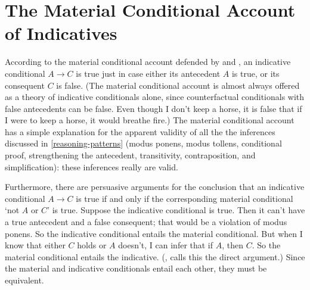 \section{The Material Conditional Account of Indicatives}
\label{material}

According to the material conditional account defended by \citet{grice-studies} and \citet{jackson}, an indicative conditional $A \rightarrow C$ is true just in case either its antecedent $A$ is true, or its consequent $C$ is false.  (The material conditional account is almost always offered as a theory of indicative conditionals alone, since counterfactual conditionals with false antecedents can be false.  Even though I don't keep a horse, it is false that if I were to keep a horse, it would breathe fire.)  The material conditional account has a simple explanation for the apparent validity of all the the inferences discussed in \autoref{reasoning-patterns} (modus ponens, modus tollens, conditional proof, strengthening the antecedent, transitivity, contraposition, and simplification): these inferences really are valid.

Furthermore, there are persuasive arguments for the conclusion that an indicative conditional $A \rightarrow C$ is true if and only if the corresponding material conditional `not $A$ or $C$' is true.  Suppose the indicative conditional is true.  Then it can't have a true antecedent and a false consequent; that would be a violation of modus ponens.  So the indicative conditional entails the material conditional.  But when I know that either $C$ holds or $A$ doesn't, I can infer that if $A$, then $C$.  So the material conditional entails the indicative.  (\citealp[136]{stalnaker-indicative}, calls this the direct argument.)  Since the material and indicative conditionals entail each other, they must be equivalent.

